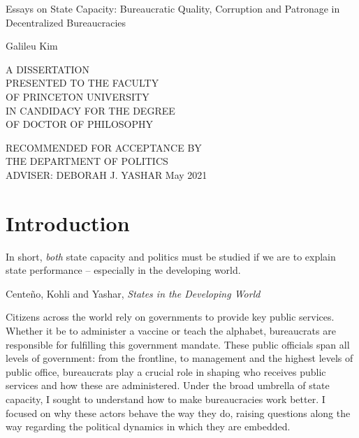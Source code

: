 \documentclass[12pt]{report}
\theoremstyle{definition}
\begin{document}
\begin{titlepage}
    \begin{center}
        \vspace*{1cm}
        
        \huge
        Essays on State Capacity: Bureaucratic Quality, Corruption and Patronage in Decentralized Bureaucracies
 
             
        \vspace{1.5cm}
        
        \LARGE
        Galileu Kim
 
        \vspace{8cm}
                
        \normalsize
        A DISSERTATION\\
        PRESENTED TO THE FACULTY\\
        OF PRINCETON UNIVERSITY\\
        IN CANDIDACY FOR THE DEGREE\\
        OF DOCTOR OF PHILOSOPHY
        
        \vspace{1cm}
        
        RECOMMENDED FOR ACCEPTANCE BY\\
        THE DEPARTMENT OF POLITICS\\
        ADVISER: DEBORAH J. YASHAR
        \vfill
        \Large
        May 2021
    \end{center}
\end{titlepage}

\section*{Introduction}

\epigraph{\singlespacing In short, \emph{both} state capacity and politics must be studied if we are to explain state performance -- especially in the developing world.}{\singlespacing Cente\~{n}o, Kohli and Yashar, \emph{States in the Developing World}}

\doublespacing

Citizens across the world rely on governments to provide key public services. Whether it be to administer a vaccine or teach the alphabet, bureaucrats are responsible for fulfilling this government mandate. These public officials span all levels of government: from the frontline, to management and the highest levels of public office, bureaucrats play a crucial role in shaping who receives public services and how these are administered. Under the broad umbrella of state capacity, I sought to understand how to make bureaucracies work better. I focused on why these actors behave the way they do, raising questions along the way regarding the political dynamics in which they are embedded.
\end{document}

